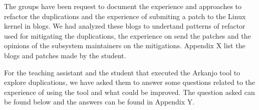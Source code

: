 The groups have been request to document the experience and approaches to refactor the duplications and the
experience of submiting a patch to the Linux kernel in blogs. We had analyzed these blogs to undertand 
patterns of refactor used for mitigating the duplications, the experience on send the patches and the 
opinions of the subsystem maintainers on the mitigations. Appendix X list the blogs and patches made by the 
student.

For the teaching assistant and the student that executed the Arkanjo tool to explore duplications, 
we have asked them to answer some questions related to the experience of using the tool and what could be
improved. The question asked can be found below and the answers can be found in Appendix Y.


